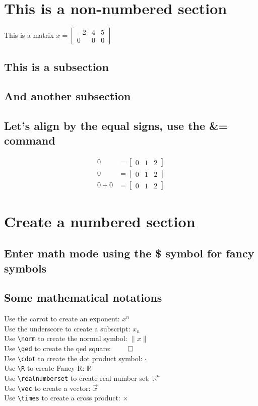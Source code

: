 \documentclass[fleqn, leqno]{article}
\newcommand{\norm}[1]{\lVert#1\rVert}
\newcommand{\R}{\mathbb{R}}
\newcommand{\realnumberset}{\mathbb{R}^n}
\begin{document}
\section*{This is a non-numbered section}
This is a matrix $x = \begin{bmatrix}
    -2 & 4 & 5 \\
    0 & 0 & 0
\end{bmatrix}
$
\subsection{This is a subsection}
\subsection{And another subsection}
\subsection{Let's align by the equal signs, use the \&= command}
\begin{align*}
0 &= \begin{bmatrix}
0 & 1 & 2
\end{bmatrix}\\
0 &= \begin{bmatrix}
    0 & 1 & 2
    \end{bmatrix}\\
0 + 0 &= \begin{bmatrix}
    0 & 1 & 2
\end{bmatrix}
\end{align*}
\section{Create a numbered section}
\subsection{Enter math mode using the \$ symbol for fancy symbols}
\subsection{Some mathematical notations}
Use the carrot to create an exponent: $x^n$\\
Use the underscore to create a subscript: 
$x_n$\\
Use \verb|\norm| to create the normal symbol: 
$\norm{x}$\\
Use \verb|\qed| to create the qed square: 
$\qed$\\
Use \verb|\cdot| to create the dot product symbol: 
$\cdot$\\
Use \verb|\R| to create Fancy R: $\R$ \\
Use \verb|\realnumberset| to create real number set: $\realnumberset$ \\
Use \verb|\vec| to create a vector: 
$\Vec{x}$\\
Use \verb|\times| to create a cross product: 
$\times$
\end{document}
